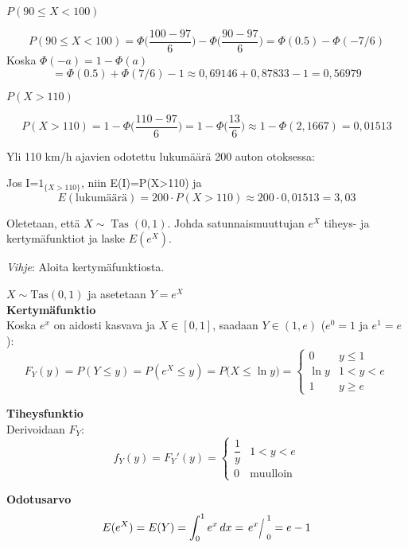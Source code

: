 \documentclass[12pt,a4paper]{article}
\begin{document}
\begin{kohta}
  \item $P(90\le X<100)$

  \[
  P(90\le X<100)=\Phi\!\Big(\frac{100-97}{6}\Big)-\Phi\!\Big(\frac{90-97}{6}\Big)
  =\Phi(0.5)-\Phi(-7/6)
  \]
  Koska $\Phi(-a)=1-\Phi(a)$
  \[
  =\Phi(0.5)+\Phi(7/6)-1 \approx 0{,}69146+0{,}87833-1
  = 0{,}56979
  \]

  \item $P(X>110)$

  \[
  P(X>110)=1-\Phi\!\Big(\frac{110-97}{6}\Big)=1-\Phi\!\Big(\frac{13}{6}\Big)
  \approx 1-\Phi(2{,}1667)=0{,}01513
  \]

  \item Yli 110 km/h ajavien odotettu lukumäärä 200 auton otoksessa:

  Jos I=$1_{\{X>110\}}$, niin E(I)=P(X>110) ja
  \[
  E(\text{lukumäärä})=200\cdot P(X>110)\approx 200\cdot 0{,}01513
  = 3{,}03
  \]
\end{kohta}









\pagebreak
{}
Oletetaan, että $X\sim\operatorname{Tas}(0,1)$.
Johda satunnaismuuttujan $e^X$ tiheys- ja kertymäfunktiot ja laske $E(e^X)$.

\noindent\emph{Vihje}: Aloita kertymäfunktiosta.
\vspace{0.8cm}


$X\sim\mathrm{Tas}(0,1)$ ja asetetaan $Y=e^X$\\

\textbf{Kertymäfunktio}\\
Koska $e^x$ on aidosti kasvava ja $X\in[0,1]$, saadaan $Y\in(1,e)$ ($e^0=1$ ja $e^1=e$):
\[
F_Y(y)=P(Y\le y)=P(e^X\le y)=P\!\big(X\le \ln y\big)=
\begin{cases}
0 & y\le 1\\[2pt]
\ln y & 1<y<e\\[2pt]
1 & y\ge e
\end{cases}
\]

\textbf{Tiheysfunktio}\\
Derivoidaan $F_Y$:
\[
f_Y(y)=F_Y'(y)=
\begin{cases}
\dfrac{1}{y} & 1<y<e\\[6pt]
0 & \text{muulloin}
\end{cases}
\]

\textbf{Odotusarvo}\\
\[
E(e^X)=E(Y)=\int_{0}^{1} e^x\,dx
= \evalslant{e^x}{0}{1}
=e-1
\]
\end{document}
